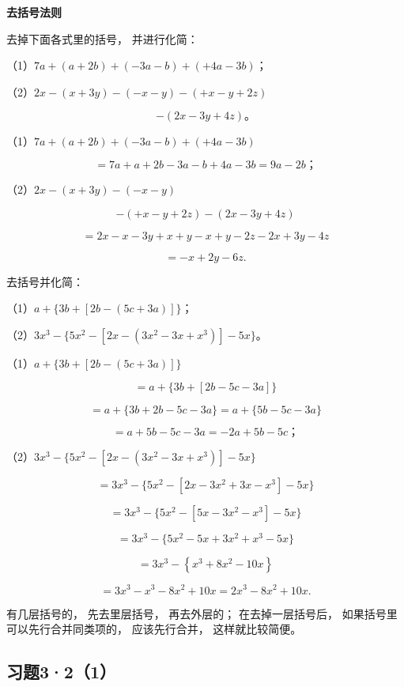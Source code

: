 \textbf{去括号法则}

 去掉下面各式里的括号， 并进行化简：

（1）\(7a + (a + 2b) + (-3a - b) + (+4a - 3b)\)；

（2）\(2x - (x + 3y) - (-x - y) - (+x - y + 2z)\)

\[
- (2 x - 3 y + 4 z)\text{。}
\]

 （1）\(7a + (a + 2b) + (-3a - b) + (+4a - 3b)\)

\[
= 7 a + a + 2 b - 3 a - b + 4 a - 3 b = 9 a - 2 b\text{；}
\]

（2）\(2x - (x + 3y) - (-x - y)\)

\[
- (+ x - y + 2 z) - (2 x - 3 y + 4 z)
\]

\[
= 2 x - x - 3 y + x + y - x + y - 2 z - 2 x + 3 y - 4 z
\]

\[
= - x + 2 y - 6 z.
\]

 去括号并化简：

（1）\(a + \{3b + [2b - (5c + 3a)]\}\)；

（2）\(3x^{3} - \{5x^{2} - [2x - (3x^{2} - 3x + x^{3})] - 5x\}\)。

 （1）\(a + \{3b + [2b - (5c + 3a)]\}\)

\[
= a + \{3 b + [ 2 b - 5 c - 3 a ] \}
\]

\[
= a + \{3 b + 2 b - 5 c - 3 a \} = a + \{5 b - 5 c - 3 a \}
\]

\[
= a + 5 b - 5 c - 3 a = - 2 a + 5 b - 5 c\text{；}
\]

（2）\(3x^{3} - \{5x^{2} - [2x - (3x^{2} - 3x + x^{3})] - 5x\}\)

\[
= 3 x ^{3} - \{5 x ^{2} - [ 2 x - 3 x ^{2} + 3 x - x ^{3} ] - 5 x \}
\]

\[
= 3 x ^{3} - \{5 x ^{2} - [ 5 x - 3 x ^{2} - x ^{3} ] - 5 x \}
\]

\[
= 3 x ^{3} - \{5 x ^{2} - 5 x + 3 x ^{2} + x ^{3} - 5 x \}
\]

\[
= 3 x ^{3} - \left\{x ^{3} + 8 x ^{2} - 10 x \right\}
\]

\[
= 3 x ^{3} - x ^{3} - 8 x ^{2} + 10 x = 2 x ^{3} - 8 x ^{2} + 10 x.
\]

 有几层括号的， 先去里层括号， 再去外层的；
在去掉一层括号后， 如果括号里可以先行合并同类项的， 应该先行合并，
这样就比较简便。

\subsection{习题3·2（1）}

